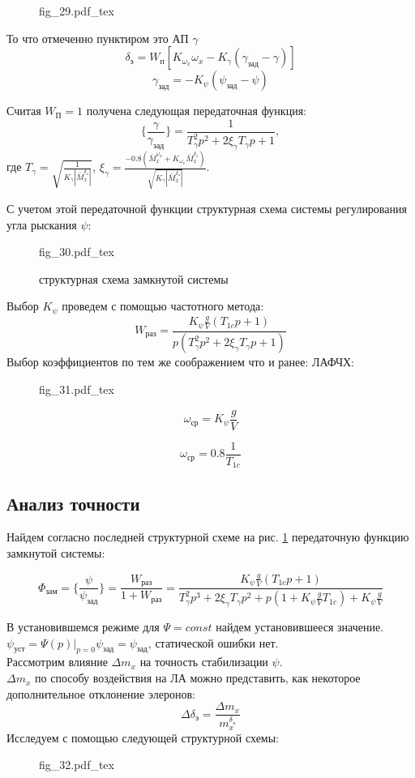 \documentclass{article}
\begin{document}
\begin{figure}[H]
\centering
{fig_29.pdf_tex}
\end{figure}

То что отмеченно пунктиром это АП $\gamma$
\[
\delta_э = W_{п}[K_{\omega_x}\omega_x - K_{\gamma}(\gamma_{зад} - \gamma)]
\]
\[
\gamma_{зад} = -K_{\psi}(\psi_{зад} - \psi)
\]

Считая $W_П = 1$ получена следующая передаточная функция:
\[
\{\frac{\gamma}{\gamma_{зад}} \}=\frac{1}{T_{\gamma}^2 p^2 + 2 \xi_{\gamma} T_\gamma p + 1},
\]
где $T_{\gamma} = \sqrt{\frac{1}{K_{\gamma}|\bar{M}_x^{\delta_э}|}}$, $\xi_{\gamma} =\frac{-0.8(\bar{M}_x^{\omega_x} + K_{\omega_x} \bar{M}_x^{\delta_э})}{\sqrt{K_\gamma |\bar{M}_x^{\delta_э}|}}$.

С учетом этой передаточной функции структурная схема системы регулирования угла рыскания $\psi$:

\begin{figure}[h]
\centering
{fig_30.pdf_tex}
\caption{структурная схема замкнутой системы}
\label{fig:zam30}
\end{figure}

Выбор $K_{\psi}$ проведем с помощью частотного метода:
\[
W_{раз} = \frac{K_{\psi} \frac{g}{V} (T_{1c}p + 1)}{p(T_{\gamma}^2 p^2 + 2 \xi_\gamma T_\gamma p + 1)}
\]
Выбор коэффициентов по тем же соображением что и ранее:
ЛАФЧХ:
\begin{figure}[H]
\centering
{fig_31.pdf_tex}
\end{figure}

\[
\omega_{ср} = K_{\psi}\frac{g}{V} 
\]

\[
\omega_{ср} = 0.8\frac{1}{T_{1c}} 
\]

\subsection{Анализ точности}
Найдем согласно последней структурной схеме на рис. \ref{fig:zam30} передаточную функцию замкнутой системы:

\[
\Phi_{зам} = \{\frac{\psi}{\psi_{зад}} \} = \frac{W_{раз}}{1 + W_{раз}} = \frac{K_{\psi}\frac{g}{V}(T_{1c}p + 1)}{T_{\gamma}^2 p^3 + 2\xi_\gamma T_\gamma p^2 + p(1 + K_{\psi}\frac{g}{V} T_{1c}) + K_{\psi}\frac{g}{V}}
\]

В установившемся режиме для $\Psi = const$ найдем установившееся значение.\\
$\psi_{уст} = \Psi(p) |_{p=0}  \psi _{зад}= \psi_{зад}$, статической ошибки нет.\\
Рассмотрим влияние $\Delta m_x$ на точность стабилизации $\psi$.\\
$\Delta m_x$ по способу воздействия на ЛА можно представить, как некоторое дополнительное отклонение элеронов:
\[
\Delta \delta_э =\frac{\Delta m_x}{m_x^{\delta_э}} 
\]
Исследуем с помощью следующей структурной схемы:
\begin{figure}[H]
\centering
{fig_32.pdf_tex}
\end{figure}
\end{document}
